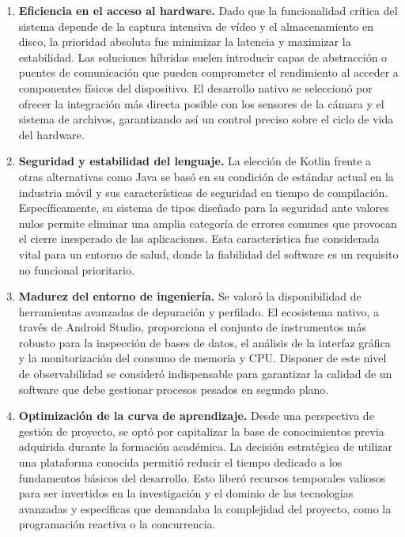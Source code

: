 \begin{enumerate}
    \item \textbf{Eficiencia en el acceso al hardware.} Dado que la funcionalidad crítica del sistema depende de la captura intensiva de vídeo y el almacenamiento en disco, la prioridad absoluta fue minimizar la latencia y maximizar la estabilidad. Las soluciones híbridas suelen introducir capas de abstracción o puentes de comunicación que pueden comprometer el rendimiento al acceder a componentes físicos del dispositivo. El desarrollo nativo se seleccionó por ofrecer la integración más directa posible con los sensores de la cámara y el sistema de archivos, garantizando así un control preciso sobre el ciclo de vida del hardware.

    \item \textbf{Seguridad y estabilidad del lenguaje.} La elección de Kotlin frente a otras alternativas como Java se basó en su condición de estándar actual en la industria móvil y sus características de seguridad en tiempo de compilación. Específicamente, su sistema de tipos diseñado para la seguridad ante valores nulos permite eliminar una amplia categoría de errores comunes que provocan el cierre inesperado de las aplicaciones. Esta característica fue considerada vital para un entorno de salud, donde la fiabilidad del software es un requisito no funcional prioritario.

    \item \textbf{Madurez del entorno de ingeniería.} Se valoró la disponibilidad de herramientas avanzadas de depuración y perfilado. El ecosistema nativo, a través de Android Studio, proporciona el conjunto de instrumentos más robusto para la inspección de bases de datos, el análisis de la interfaz gráfica y la monitorización del consumo de memoria y CPU. Disponer de este nivel de observabilidad se consideró indispensable para garantizar la calidad de un software que debe gestionar procesos pesados en segundo plano.

    \item \textbf{Optimización de la curva de aprendizaje.} Desde una perspectiva de gestión de proyecto, se optó por capitalizar la base de conocimientos previa adquirida durante la formación académica. La decisión estratégica de utilizar una plataforma conocida permitió reducir el tiempo dedicado a los fundamentos básicos del desarrollo. Esto liberó recursos temporales valiosos para ser invertidos en la investigación y el dominio de las tecnologías avanzadas y específicas que demandaba la complejidad del proyecto, como la programación reactiva o la concurrencia.


\end{enumerate}
